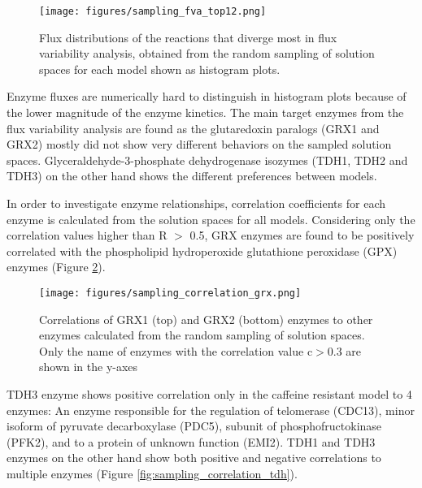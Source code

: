 \begin{figure}[H]
  \begin{center}
  \texttt{[image: figures/sampling\_fva\_top12.png]}
  \caption[Flux distributions of the reactions that diverge  most in flux variability analysis, obtained from the random sampling of solution spaces for each model shown as histogram plots]{Flux distributions of the reactions that diverge most in flux variability analysis, obtained from the random sampling of solution spaces for each model shown as histogram plots.}
  \label{fig:sampling_fva_top12}
  \end{center}
\end{figure}

Enzyme fluxes are numerically hard to distinguish in histogram plots because of the lower magnitude of the enzyme kinetics. The main target enzymes from the flux variability analysis are found as the glutaredoxin paralogs (GRX1 and GRX2) mostly did not show very different behaviors on the sampled solution spaces. Glyceraldehyde-3-phosphate dehydrogenase isozymes (TDH1, TDH2 and TDH3) on the other hand shows the different preferences between models.

In order to investigate enzyme relationships, correlation coefficients for each enzyme is calculated from the solution spaces for all models. Considering only the correlation values higher than R $>$ 0.5, GRX enzymes are found to be positively correlated with the phospholipid hydroperoxide glutathione peroxidase (GPX) enzymes (Figure \ref{fig:sampling_correlation_grx}).

\begin{figure}[H]
  \begin{center}
  \texttt{[image: figures/sampling\_correlation\_grx.png]}
  \caption[Correlations of GRX1 (top) and GRX2 (bottom) enzymes to other enzymes calculated from the random sampling of solution spaces. Only the name of enzymes with the correlation value c$>$0.8 are shown in the y-axes]{Correlations of GRX1 (top) and GRX2 (bottom) enzymes to other enzymes calculated from the random sampling of solution spaces. Only the name of enzymes with the correlation value c$>$0.3 are shown in the y-axes}
  \label{fig:sampling_correlation_grx}
  \end{center}
\end{figure}

TDH3 enzyme shows positive correlation only in the caffeine resistant model to 4 enzymes: An enzyme responsible for the regulation of telomerase (CDC13), minor isoform of pyruvate decarboxylase (PDC5), subunit of phosphofructokinase (PFK2), and to a protein of unknown function (EMI2). TDH1 and TDH3 enzymes on the other hand show both positive and negative correlations to multiple enzymes (Figure \ref{fig:sampling_correlation_tdh}).

